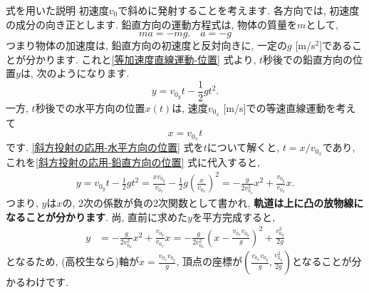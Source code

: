 \documentclass[11pt,dvipdfmx]{jsarticle}
\numberwithin{equation}{section} %
\begin{document}
\begin{freebox}{式を用いた説明}
初速度$v_{0}$で斜めに発射することを考えます. 各方向では, 初速度の成分の向き正とします. 鉛直方向の運動方程式は, 物体の質量を$m$として, 
\begin{equation}
    ma = -mg. \quad a = -g
\end{equation}
つまり物体の加速度は, 鉛直方向の初速度と反対向きに, 一定の$g$ [m/s$^2$]であることが分かります. これと\eqref{等加速度直線運動-位置} 式より, $t$秒後での鉛直方向の位置$y$は, 次のようになります.
\begin{equation}
    y = v_{0_{y}}t -\frac{1}{2}gt^2.\label{斜方投射の応用-鉛直方向の位置}
\end{equation}
一方, $t$秒後での水平方向の位置$x(t)$は, 速度$v_{0_{x}}$ [m/s]での等速直線運動を考えて
\begin{equation}
    x = v_{0_{x}}t\label{斜方投射の応用-水平方向の位置}
\end{equation}
です. \eqref{斜方投射の応用-水平方向の位置} 式を$t$について解くと, $t = x/v_{0_{x}}$であり, これを\eqref{斜方投射の応用-鉛直方向の位置} 式に代入すると, 
\begin{align}
    y = v_{0_{y}}t -\frac{1}{2}gt^2
    = \frac{xv_{0_{y}}}{v_{0_{x}}} - \frac{1}{2}g\left(\frac{x}{v_{0_{x}}}\right)^2
    = -\frac{g}{2v_{0_{x}}^2}x^2 + \frac{v_{0_{y}}}{v_{0_{x}}}x.
\end{align}
つまり, $y$は$x$の, $2$次の係数が負の2次関数として書かれ, \textbf{軌道は上に凸の放物線になることが分かります}. 尚, 直前に求めた$y$を平方完成すると, 
\begin{align}
    y &=  -\frac{g}{2v_{0_{x}}^2}x^2 + \frac{v_{0_{y}}}{v_{0_{x}}}x = -\frac{g}{2v_{0_{x}}^2}\left(x - \frac{v_{0_{x}}v_{0_{y}}}{g}\right)^2 + \frac{v_{0_{y}}^2}{2g}
\end{align}
となるため, (高校生なら)軸が$x = \frac{v_{0_{x}}v_{0_{y}}}{g}$, 頂点の座標が$\left(\frac{v_{0_{x}}v_{0_{y}}}{g}, \frac{v_{0_{y}}^2}{2g}\right)$となることが分かるわけです. 
\end{freebox}
\end{document}

